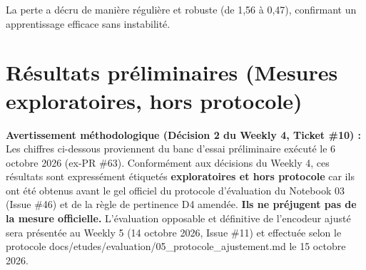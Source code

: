 \documentclass[11pt,a4paper]{article}
\newcommand{\code}[1]  {{\ttfamily #1}}
\newcommand{\rulebreak}{}
\begin{document}
La perte a décru de manière régulière et robuste (de 1,56 à 0,47), confirmant un apprentissage efficace sans instabilité.
\rulebreak

\section{Résultats préliminaires (Mesures exploratoires, hors protocole)}
\begin{callout}
\textbf{Avertissement méthodologique (Décision 2 du Weekly 4, Ticket \#10) :}   Les chiffres ci-dessous proviennent du banc d'essai préliminaire exécuté le 6 octobre 2026 (ex-PR \#63). Conformément aux décisions du Weekly 4, ces résultats sont expressément étiquetés \textbf{\og exploratoires et hors protocole\fg{}} car ils ont été obtenus avant le gel officiel du protocole d'évaluation du Notebook 03 (Issue \#46) et de la règle de pertinence D4 amendée.   \textbf{Ils ne préjugent pas de la mesure officielle.} L'évaluation opposable et définitive de l'encodeur ajusté sera présentée au Weekly 5 (14 octobre 2026, Issue \#11) et effectuée selon le protocole \code{docs/\allowbreak{}etudes/\allowbreak{}evaluation/\allowbreak{}05\_\allowbreak{}protocole\_\allowbreak{}ajustement.\allowbreak{}md} le 15 octobre 2026.
\end{callout}
\end{document}
